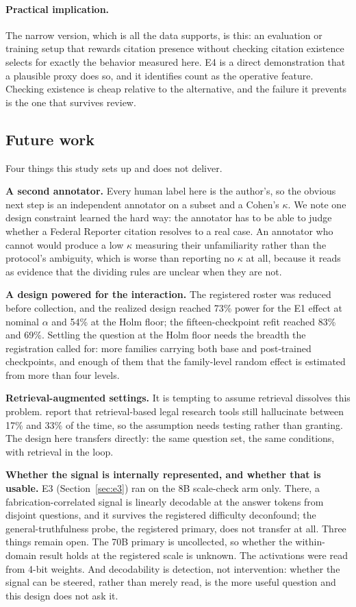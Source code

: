 \paragraph{Practical implication.}
The narrow version, which is all the data supports, is this: an evaluation or
training setup that rewards citation presence without checking citation existence
selects for exactly the behavior measured here. E4 is a direct demonstration that
a plausible proxy does so, and it identifies count as the operative feature.
Checking existence is cheap relative to the alternative, and the failure it
prevents is the one that survives review.

\subsection{Future work}

Four things this study sets up and does not deliver.

\textbf{A second annotator.} Every human label here is the author's, so the
obvious next step is an independent annotator on a subset and a Cohen's $\kappa$.
We note one design constraint learned the hard way: the annotator has to be able
to judge whether a Federal Reporter citation resolves to a real case. An
annotator who cannot would produce a low $\kappa$ measuring their unfamiliarity
rather than the protocol's ambiguity, which is worse than reporting no $\kappa$
at all, because it reads as evidence that the dividing rules are unclear when
they are not.

\textbf{A design powered for the interaction.} The registered roster was reduced
before collection, and the realized design reached 73\% power for the E1 effect
at nominal $\alpha$ and 54\% at the Holm floor; the fifteen-checkpoint refit
reached 83\% and 69\%. Settling the question at the Holm floor needs the breadth
the registration called for: more families carrying both base and post-trained
checkpoints, and enough of them that the family-level random effect is estimated
from more than four levels.

\textbf{Retrieval-augmented settings.} It is tempting to assume retrieval
dissolves this problem. \citet{magesh2024} report that retrieval-based legal
research tools still hallucinate between 17\% and 33\% of the time, so the
assumption needs testing rather than granting. The design here transfers
directly: the same question set, the same conditions, with retrieval in the loop.

\textbf{Whether the signal is internally represented, and whether that is
usable.} E3 (Section~\ref{sec:e3}) ran on the 8B scale-check arm only. There, a
fabrication-correlated signal is linearly decodable at the answer tokens from
disjoint questions, and it survives the registered difficulty deconfound; the
general-truthfulness probe, the registered primary, does not transfer at all.
Three things remain open. The 70B primary is uncollected, so whether the
within-domain result holds at the registered scale is unknown. The activations
were read from 4-bit weights. And decodability is detection, not intervention:
whether the signal can be steered, rather than merely read, is the more useful
question and this design does not ask it.
